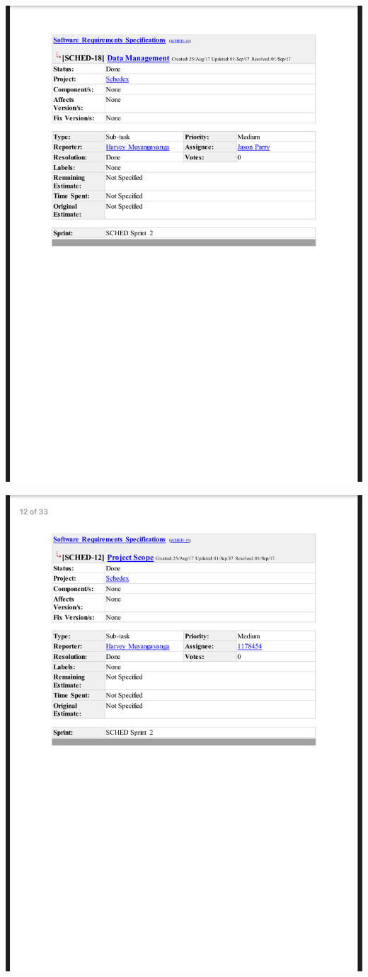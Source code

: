 \documentclass{article}
\begin{document}
\centerline{\includegraphics[scale=0.4]{sprint2_2}}

\centerline{\includegraphics[scale=0.4]{sprint2_3}}
\end{document}
